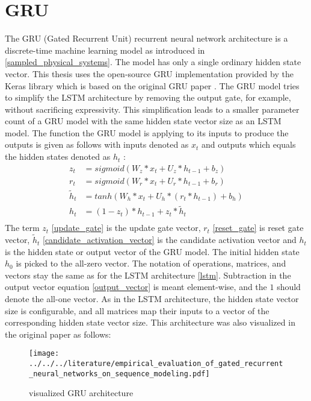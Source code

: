 \documentclass[draft,final]{vutinfth} %
\begin{document}
    \section{GRU} \label{gru}
    The GRU (Gated Recurrent Unit) recurrent neural network architecture is a discrete-time machine learning model as introduced in \ref{sampled_physical_systems}.
    The model has only a single ordinary hidden state vector.
    This thesis uses the open-source GRU implementation provided by the Keras library \cite{Keras} which is based on the original GRU paper \cite{GRU}.
    The GRU model tries to simplify the LSTM architecture by removing the output gate, for example, without sacrificing expressivity.
    This simplification leads to a smaller parameter count of a GRU model with the same hidden state vector size as an LSTM model.
    The function the GRU model is applying to its inputs to produce the outputs is given as follows with inputs denoted as $x_t$ and outputs which equals the hidden states denoted as $h_t$ \cite[p. 4]{GRU}:
    \begin{align}
        \label{update_gate} z_t &= sigmoid(W_z*x_t + U_z*h_{t-1} + b_z) \\
        \label{reset_gate} r_t &= sigmoid(W_r*x_t + U_r*h_{t-1} + b_r) \\
        \label{candidate_activation_vector} \tilde{h}_t &= tanh(W_h*x_t + U_h*(r_t * h_{t-1}) + b_h) \\
        \label{output_vector} h_t &= (1 - z_t) * h_{t-1} + z_t * \tilde{h}_t \\
    \end{align}
    The term $z_t$ \ref{update_gate} is the update gate vector, $r_t$ \ref{reset_gate} is reset gate vector, $\tilde{h}_t$ \ref{candidate_activation_vector} is the candidate activation vector and $h_t$ is the hidden state or output vector of the GRU model.
    The initial hidden state $h_0$ is picked to the all-zero vector.
    The notation of operations, matrices, and vectors stay the same as for the LSTM architecture \ref{lstm}.
    Subtraction in the output vector equation \ref{output_vector} is meant element-wise, and the $1$ should denote the all-one vector.
    As in the LSTM architecture, the hidden state vector size is configurable, and all matrices map their inputs to a vector of the corresponding hidden state vector size.
    This architecture was also visualized in the original paper as follows:
    \begin{figure}[H]
        \centering{}
        \texttt{[image: ../../../literature/empirical\_evaluation\_of\_gated\_recurrent\_neural\_networks\_on\_sequence\_modeling.pdf]}
        \caption{visualized GRU architecture \cite[p. 3]{GRU}}
        \label{fig:gru_vis}
    \end{figure}
\end{document}
